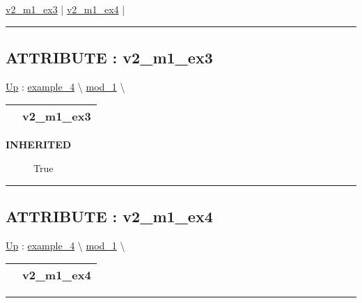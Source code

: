 \par


\hyperlink{ecldoc:inintest.example_3.mod_1.v2_m1_ex3}{v2\_m1\_ex3}  |
\hyperlink{ecldoc:example_4.mod_1.v2_m1_ex4}{v2\_m1\_ex4}  |

\rule{\linewidth}{0.5pt}

\subsection*{ATTRIBUTE : v2\_m1\_ex3}
\hypertarget{ecldoc:inintest.example_3.mod_1.v2_m1_ex3}{}
\hyperlink{ecldoc:example_4.mod_1}{Up} :
\hspace{0pt} \hyperlink{ecldoc:example_4}{example_4} \textbackslash 
\hspace{0pt} \hyperlink{ecldoc:example_4.mod_1}{mod_1} \textbackslash 

{\renewcommand{\arraystretch}{1.5}
\begin{tabularx}{\textwidth}{|>{\raggedright\arraybackslash}l|X|}
\hline
\hspace{0pt} & v2\_m1\_ex3 \\
\hline
\end{tabularx}
}

\par

\par
\begin{description}
\item [\textbf{INHERITED}] True
\end{description}

\rule{\linewidth}{0.5pt}
\subsection*{ATTRIBUTE : v2\_m1\_ex4}
\hypertarget{ecldoc:example_4.mod_1.v2_m1_ex4}{}
\hyperlink{ecldoc:example_4.mod_1}{Up} :
\hspace{0pt} \hyperlink{ecldoc:example_4}{example_4} \textbackslash 
\hspace{0pt} \hyperlink{ecldoc:example_4.mod_1}{mod_1} \textbackslash 

{\renewcommand{\arraystretch}{1.5}
\begin{tabularx}{\textwidth}{|>{\raggedright\arraybackslash}l|X|}
\hline
\hspace{0pt} & v2\_m1\_ex4 \\
\hline
\end{tabularx}
}

\par


\rule{\linewidth}{0.5pt}




